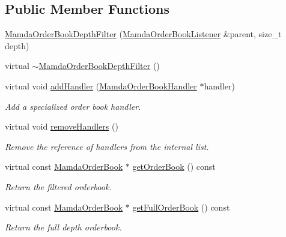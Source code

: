 \subsection*{Public Member Functions}
\begin{CompactItemize}
\item 
\hyperlink{classMamdaOrderBookDepthFilter_d45bb83d3e4b75f23000ab10f753d6c5}{Mamda\-Order\-Book\-Depth\-Filter} (\hyperlink{classWombat_1_1MamdaOrderBookListener}{Mamda\-Order\-Book\-Listener} \&parent, size\_\-t depth)
\item 
virtual \hyperlink{classMamdaOrderBookDepthFilter_016e593f9247c58f54ff1fca80373e9b}{$\sim$Mamda\-Order\-Book\-Depth\-Filter} ()
\item 
virtual void \hyperlink{classMamdaOrderBookDepthFilter_60862fa9b9c5835445940630b5f982d6}{add\-Handler} (\hyperlink{classWombat_1_1MamdaOrderBookHandler}{Mamda\-Order\-Book\-Handler} $\ast$handler)
\begin{CompactList}\small\item\em Add a specialized order book handler. \item\end{CompactList}\item 
virtual void \hyperlink{classMamdaOrderBookDepthFilter_699f621c1462b0787b6c1391bd48f32a}{remove\-Handlers} ()
\begin{CompactList}\small\item\em Remove the reference of handlers from the internal list. \item\end{CompactList}\item 
virtual const \hyperlink{classWombat_1_1MamdaOrderBook}{Mamda\-Order\-Book} $\ast$ \hyperlink{classMamdaOrderBookDepthFilter_8ea01fc66c28b7ac4dbb3939e340aad0}{get\-Order\-Book} () const 
\begin{CompactList}\small\item\em Return the filtered orderbook. \item\end{CompactList}\item 
virtual const \hyperlink{classWombat_1_1MamdaOrderBook}{Mamda\-Order\-Book} $\ast$ \hyperlink{classMamdaOrderBookDepthFilter_c1e0b29a1272610fb3b425cafe70410c}{get\-Full\-Order\-Book} () const 
\begin{CompactList}\small\item\em Return the full depth orderbook. \item\end{CompactList}\item 

\end{CompactItemize}
